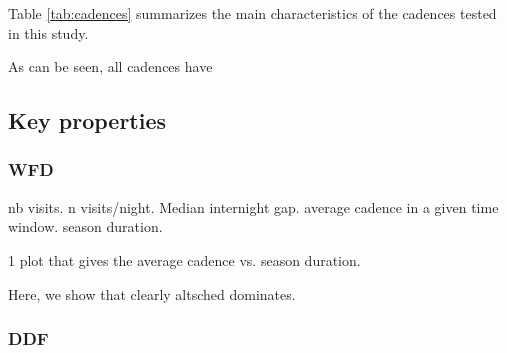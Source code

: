 \documentclass [11pt,a4paper]{article}
\begin{document}
Table \ref{tab:cadences} summarizes the main characteristics of the
cadences tested in this study.  

As can be seen, all cadences have 


\subsection{Key properties}

\subsubsection {WFD}


nb visits. n visits/night. Median internight gap. average cadence in a given time window. season duration. 

1 plot that gives the average cadence vs. season duration. 

Here, we show that clearly altsched dominates. 



\subsubsection{DDF}
\end{document}
